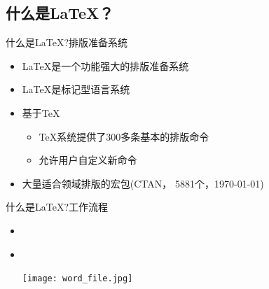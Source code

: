 \documentclass[fontset = none, xcolor=svgnames, t, aspectratio=169]{ctexbeamer}
\begin{document}
\subsection[是什么？]{什么是\LaTeX ？}\label{sec01-02}
\begin{frame}[t]{什么是\LaTeX?}{排版准备系统}
  \stretchon
  \begin{itemize}
  \item \LaTeX{}是一个功能强大的排版准备系统
  \item \LaTeX{}是标记型语言系统
  \item 基于\TeX
    \begin{itemize}
    \item \TeX{}系统提供了300多条基本的排版命令
    \item 允许用户自定义新命令
    \end{itemize}
  \item 大量适合领域排版的宏包(CTAN，
    \alert{5881}个，\today )
  \end{itemize}
  \stretchoff
\end{frame}

\begin{frame}[t]{什么是\LaTeX?}{工作流程}
  \begin{itemize}
  \item \wysiwym\\[4ex]
    \begin{center}
    \end{center}
    \vspace{4ex}
  \item \wysiwyg\\[4ex]
    \begin{center}
      \texttt{[image: word\_file.jpg]}
    \end{center}
  \end{itemize}
\end{frame}
\end{document}
